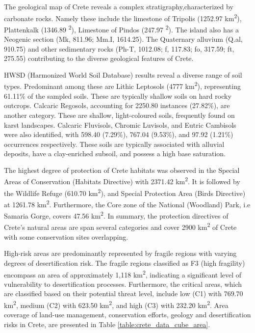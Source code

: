 The geological map of Crete reveals a complex stratigraphy,characterized by carbonate
rocks. Namely these include the limestone of Tripolis (1252.97 km\textsuperscript{2}),
Plattenkalk (1346.89 \textsuperscript{2}), Limestone of Pindos (247.97 \textsuperscript{2}).
The island also has a Neogenic section (Mk, 811.96; Mm.I, 1614.25). The
Quaternary alluvium (Q.al, 910.75) and other sedimentary rocks (Ph-T, 1012.08; f, 117.83; fo, 317.59; ft, 275.55)
contributing to the diverse geological features of Crete.

HWSD (Harmonized World Soil Database) results reveal a diverse range of soil types.
Predominant among these are Lithic Leptosols (4777 km\textsuperscript{2}),
representing 61.11\% of the sampled soils.
These are typically shallow soils on hard rocky outcrops.
Calcaric Regosols, accounting for 2250.80 instances (27.82\%),
are another category. These are shallow, light-coloured soils, frequently
found on karst landscapes.
Calcaric Fluvisols, Chromic Luvisols, and Eutric Cambisols were also
identified, with 598.40 (7.29\%), 767.04 (9.53\%), and 97.92 (1.21\%) occurrences
respectively. These soils are typically associated with alluvial deposits, have
a clay-enriched subsoil, and possess a high base saturation.

The highest degree of protection of Crete habitats was observed in the Special Areas
of Conservation (Habitats Directive) with 2371.42 km\textsuperscript{2}.
It is followed by the Wildlife Refuge (610.70 km\textsuperscript{2}),
and Special Protection Area (Birds Directive) at 1261.78 km\textsuperscript{2}.
Furthermore, the Core zone of the National (Woodland) Park, i.e Samaria Gorge, covers 47.56 km\textsuperscript{2}.
In summary, the protection directives of Crete's natural areas are span several categories and cover 2900 km\textsuperscript{2}
of Crete with some conservation sites overlapping.

High-risk areas are predominantly represented by fragile regions with varying
degrees of desertification risk. The fragile regions classified as F3 (high fragility)
encompass an area of approximately 1,118 km\textsuperscript{2},
indicating a significant level of vulnerability to desertification processes.
Furthermore, the critical areas, which are classified based on their potential
threat level, include low (C1) with 769.70 km\textsuperscript{2}, medium (C2)
with 623.50 km\textsuperscript{2}, and high (C3) with 232.20 km\textsuperscript{2}.
Area coverage of land-use management, conservation efforts, geology and
desertification risks in Crete, are presented in Table \ref{table:crete_data_cube_area}.

